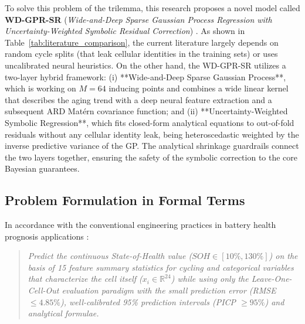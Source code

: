 \documentclass[a4paper,fleqn]{cas-sc}
\begin{document}
To solve this problem of the trilemma, this research proposes a novel model called \textbf{WD-GPR-SR} (\textit{Wide-and-Deep Sparse Gaussian Process Regression with Uncertainty-Weighted Symbolic Residual Correction}) \cite{hu2026multiphysics, cranmer2023pysr, titsias2009variational}. As shown in Table~\ref{tab:literature_comparison}, the current literature largely depends on random cycle splits (that leak cellular identities in the training sets) or uses uncalibrated neural heuristics. On the other hand, the WD-GPR-SR utilizes a two-layer hybrid framework: (i) **Wide-and-Deep Sparse Gaussian Process**, which is working on $M=64$ inducing points and combines a wide linear kernel that describes the aging trend with a deep neural feature extraction and a subsequent ARD Matérn covariance function; and (ii) **Uncertainty-Weighted Symbolic Regression**, which fits closed-form analytical equations to out-of-fold residuals without any cellular identity leak, being heteroscedastic weighted by the inverse predictive variance of the GP. The analytical shrinkage guardrails connect the two layers together, ensuring the safety of the symbolic correction to the core Bayesian guarantees.

\subsection{Problem Formulation in Formal Terms}
In accordance with the conventional engineering practices in battery health prognosis applications \cite{guidelines}:
\begin{quote}
\textit{Predict the continuous State-of-Health value ($SOH \in [10\%, 130\%]$) on the basis of 15 feature summary statistics for cycling and categorical variables that characterize the cell itself ($x_i \in \mathbb{R}^{24}$) while using only the Leave-One-Cell-Out evaluation paradigm with the small prediction error (RMSE $\le 4.85\%$), well-calibrated 95\% prediction intervals (PICP $\ge 95\%$) and analytical formulae.}
\end{quote}
\end{document}
